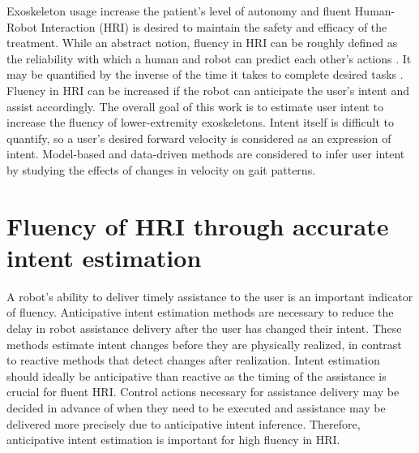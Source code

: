 Exoskeleton usage increase the patient's level of autonomy and fluent Human-Robot Interaction (HRI) is desired to maintain the safety and efficacy of the treatment. While an abstract notion, fluency in HRI can be roughly defined as the reliability with which a human and robot can predict each other's actions \cite{hoffman2007cost}. It may be quantified by the inverse of the time it takes to complete desired tasks \cite{hoffman2019evaluating}. Fluency in HRI can be increased if the robot can anticipate the user's intent and assist accordingly. The overall goal of this work is to estimate user intent to increase the fluency of lower-extremity exoskeletons. Intent itself is difficult to quantify, so a user's desired forward velocity is considered as an expression of intent. Model-based and data-driven methods are considered to infer user intent by studying the effects of changes in velocity on gait patterns.

\section{Fluency of HRI through accurate intent estimation}

A robot's ability to deliver timely assistance to the user is an important indicator of fluency. Anticipative intent estimation methods are necessary to reduce the delay in robot assistance delivery after the user has changed their intent. These methods estimate intent changes before they are physically realized, in contrast to reactive methods that detect changes after realization. Intent estimation should ideally be anticipative than reactive as the timing of the assistance is crucial for fluent HRI. Control actions necessary for assistance delivery may be decided in advance of when they need to be executed and assistance may be delivered more precisely due to anticipative intent inference. Therefore, anticipative intent estimation is important for high fluency in HRI.

